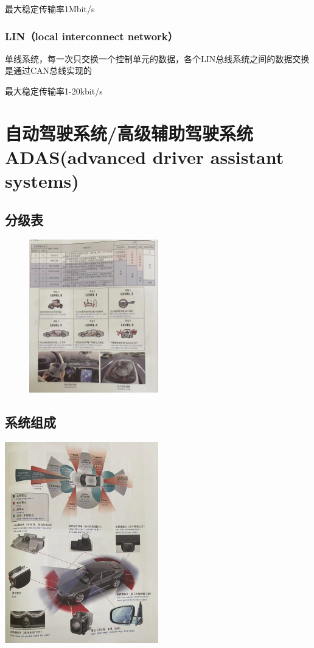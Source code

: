 		最大稳定传输率1Mbit/s
	\subsubsection{LIN（local interconnect network）}
		单线系统，每一次只交换一个控制单元的数据，各个LIN总线系统之间的数据交换是通过CAN总线实现的
		
		最大稳定传输率1-20kbit/s
\section{自动驾驶系统/高级辅助驾驶系统ADAS(advanced driver assistant systems)}
\subsection{分级表}
	\begin{figure}[htbp]
		\centering
		\includegraphics[width=0.5\textwidth]{5-25}
	\end{figure}
\subsection{系统组成}
	\begin{center}
		\includegraphics[width=0.5\textwidth]{5-26}
	\end{center}
